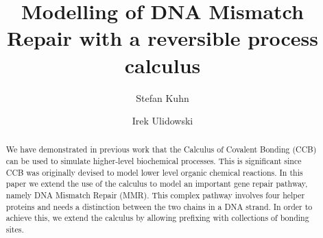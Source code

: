 \documentclass[review]{elsarticle}
\begin{document}
\begin{frontmatter}

\title{Modelling of DNA Mismatch Repair with a reversible process calculus}

\author{Stefan Kuhn}%
\address{School of Computer Science and Informatics, De Montfort University, Leicester, UK}

\author{Irek Ulidowski}%
\address{School of Computing and Mathematical Sciences, University of Leicester, Leicester, UK}


%

\begin{abstract}
%
%
We have demonstrated in previous work that the Calculus of Covalent Bonding (CCB) can be used to simulate higher-level biochemical processes. This is significant since CCB was originally devised to model lower level organic chemical reactions. In this paper we extend the use of the calculus  to model an important gene repair pathway, namely DNA Mismatch Repair (MMR). This complex pathway involves four helper proteins and needs a distinction between the two chains in a DNA strand. 
In order to achieve this, we extend the calculus by allowing prefixing with collections of bonding sites.
\end{abstract}


\end{frontmatter}
\end{document}
